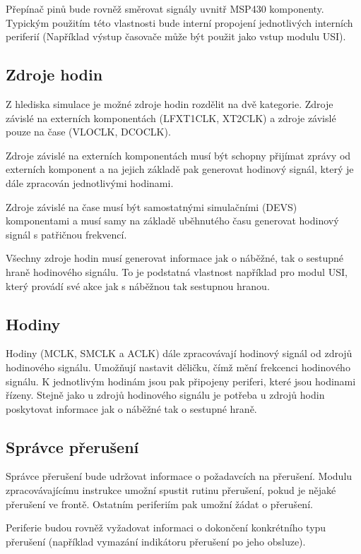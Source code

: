Přepínač pinů bude rovněž směrovat signály uvnitř MSP430 komponenty. Typickým použitím této vlastnosti bude interní propojení jednotlivých interních periferií (Například výstup časovače může být použit jako vstup modulu USI).

\subsection{Zdroje hodin}

Z hlediska simulace je možné zdroje hodin rozdělit na dvě kategorie. Zdroje závislé na externích komponentách (LFXT1CLK, XT2CLK) a zdroje závislé pouze na čase (VLOCLK, DCOCLK).

Zdroje závislé na externích komponentách musí být schopny přijímat zprávy od externích komponent a na jejich základě pak generovat hodinový signál, který je dále zpracován jednotlivými hodinami.

Zdroje závislé na čase musí být samostatnými simulačními (DEVS) komponentami a musí samy
na základě uběhnutého času generovat hodinový signál s patřičnou frekvencí.

Všechny zdroje hodin musí generovat informace jak o náběžné, tak o sestupné hraně hodinového signálu. To je podstatná vlastnost například pro modul USI, který provádí své akce jak s náběžnou tak sestupnou hranou.

\subsection{Hodiny}

Hodiny (MCLK, SMCLK a ACLK) dále zpracovávají hodinový signál od zdrojů hodinového signálu. Umožňují nastavit děličku, čímž mění frekcenci hodinového signálu. K jednotlivým hodinám jsou pak připojeny periferi, které jsou hodinami řízeny. Stejně jako u zdrojů hodinového signálu je potřeba u zdrojů hodin
poskytovat informace jak o náběžné tak o sestupné hraně.

\subsection{Správce přerušení}

Správce přerušení bude udržovat informace o požadavcích na přerušení. Modulu zpracovávajícímu instrukce umožní spustit rutinu přerušení, pokud je nějaké
přerušení ve frontě. Ostatním periferiím pak umožní žádat o přerušení.

Periferie budou rovněž vyžadovat informaci o dokončení konkrétního typu přerušení (například vymazání indikátoru přerušení po jeho obsluze).

